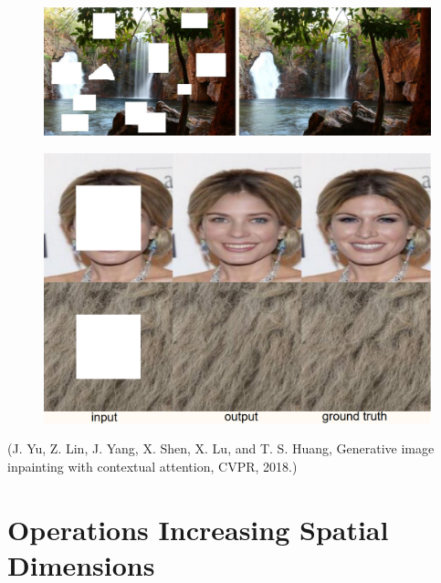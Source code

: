 \documentclass{report}
\begin{document}
\begin{example}
    \begin{figure}[H]
        \centering
        \includegraphics[width=1.0\textwidth]{.././assets/8.11.png}
    \end{figure}

    \begin{figure}[H]
        \centering
        \includegraphics[width=1.0\textwidth]{.././assets/8.12.png}
    \end{figure}

    (J. Yu, Z. Lin, J. Yang, X. Shen, X. Lu, and T. S. Huang, Generative image inpainting with contextual attention, CVPR, 2018.)
\end{example}

\section{Operations Increasing Spatial Dimensions}
\end{document}
